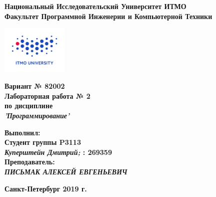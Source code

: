 \documentclass[11pt]{article}
\author{АВТОР}
\date{\today}
\title{}
\begin{document}
\large
\thispagestyle{empty}
\begin{center}
\textbf{Национальный Исследовательский Университет ИТМО}\\
\textbf{Факультет Программной Инженерии и Компьютерной Техники}\\
\end{center}
\vspace{2em}
\begin{center}
\includegraphics[width=120px]{../../../itmo-logo.png}
\end{center}
\LARGE
\vspace{5em}
\begin{center}
\textbf{Вариант № 82002}\\
\textbf{Лабораторная работа № 2}\\
\Large
\textbf{по дисциплине}\\
\LARGE
\textbf{\emph{'Программирование'}}\\
\end{center}
\vspace{11em}
\large
\begin{flushright}
\textbf{Выполнил:}\\
\textbf{Студент группы P3113}\\
\textbf{\emph{Куперштейн Дмитрий;} : 269359}\\
\textbf{Преподаватель:}\\
\textbf{\emph{ПИСЬМАК АЛЕКСЕЙ ЕВГЕНЬЕВИЧ}}\\
\end{flushright}
\vspace{4em}
\large
\begin{center}
\textbf{Санкт-Петербург 2019 г.}
\end{center}
\pagebreak{}
\setcounter{tocdepth}{2}
\tableofcontents
\vspace{2em}
\pagebreak
\end{document}
